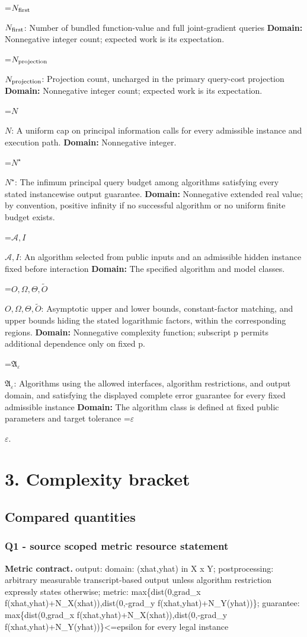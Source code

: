 \documentclass[10pt,a4paper]{article}
\newcommand{\AtlasMath}[1]{\par\begingroup\centering\setbox0=\hbox{$\displaystyle #1$}\ifdim\wd0>1.4\linewidth\typeout{ATLAS WIDE FORMULA: \the\wd0}\fi\ifdim\wd0>\linewidth\resizebox{\linewidth}{!}{\box0}\else\box0\fi\par\endgroup}
\newcommand{\AtlasInlineMath}[1]{\begingroup\setbox0=\hbox{$#1$}\ifdim\wd0>.4\linewidth\endgroup\AtlasMath{#1}\else\endgroup$#1$\fi}
\begin{document}
\AtlasInlineMath{N_{\rm first}}: Number of bundled function-value and full joint-gradient queries \textbf{Domain:} Nonnegative integer count; expected work is its expectation.

\AtlasInlineMath{N_{\rm projection}}: Projection count, uncharged in the primary query-cost projection \textbf{Domain:} Nonnegative integer count; expected work is its expectation.

\AtlasInlineMath{N}: A uniform cap on principal information calls for every admissible instance and execution path. \textbf{Domain:} Nonnegative integer.

\AtlasInlineMath{N^\star}: The infimum principal query budget among algorithms satisfying every stated instancewise output guarantee. \textbf{Domain:} Nonnegative extended real value; by convention, positive infinity if no successful algorithm or no uniform finite budget exists.

\AtlasInlineMath{\mathcal A,I}: An algorithm selected from public inputs and an admissible hidden instance fixed before interaction \textbf{Domain:} The specified algorithm and model classes.

\AtlasInlineMath{O,\Omega,\Theta,\widetilde O}: Asymptotic upper and lower bounds, constant-factor matching, and upper bounds hiding the stated logarithmic factors, within the corresponding regions. \textbf{Domain:} Nonnegative complexity function; subscript p permits additional dependence only on fixed p.

\AtlasInlineMath{\mathfrak A_\varepsilon}: Algorithms using the allowed interfaces, algorithm restrictions, and output domain, and satisfying the displayed complete error guarantee for every fixed admissible instance \textbf{Domain:} The algorithm class is defined at fixed public parameters and target tolerance \AtlasInlineMath{\varepsilon}.

\section{3. Complexity bracket}
\subsection{Compared quantities}
\subsubsection{Q1 - source scoped metric resource statement}
\textbf{Metric contract.} output: domain: (xhat,yhat) in X x Y; postprocessing: arbitrary measurable transcript-based output unless algorithm restriction expressly states otherwise; metric: max\{dist(0,grad\_x f(xhat,yhat)+N\_X(xhat)),dist(0,-grad\_y f(xhat,yhat)+N\_Y(yhat))\}; guarantee: max\{dist(0,grad\_x f(xhat,yhat)+N\_X(xhat)),dist(0,-grad\_y f(xhat,yhat)+N\_Y(yhat))\}<=epsilon for every legal instance
\end{document}

